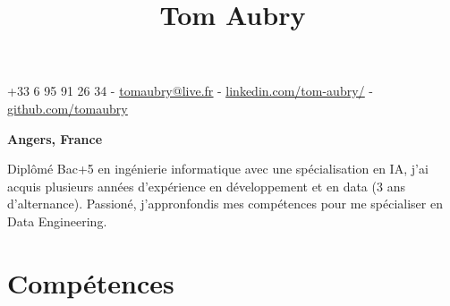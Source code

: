 \documentclass{article}
\title{Tom Aubry}
\date{}
\begin{document}
\maketitle
\thispagestyle{empty} %
\vspace{-6,5em}

\begin{center}
+33 6 95 91 26 34 - \href{mailto:tomaubry@live.fr}{\underline{tomaubry@live.fr}} - \href{www.linkedin.com/in/tom-aubry-85b024209}{\underline{linkedin.com/tom-aubry/}} - \href{ https://github.com/tomaubry}{\underline{github.com/tomaubry}}
\end{center}
\begin{center}
\textbf{Angers, France}
\end{center}


\begin{center}
Diplômé Bac+5 en ingénierie informatique avec une spécialisation en IA, j’ai acquis plusieurs années d’expérience en développement et en data (3 ans d’alternance). Passioné, j'appronfondis mes compétences pour me spécialiser en Data Engineering.
\end{center}

\section*{Compétences}
\end{document}
